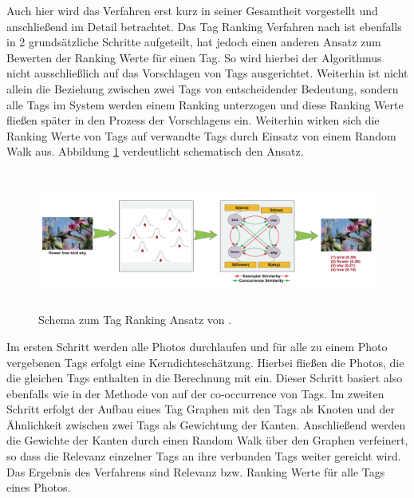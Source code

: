 
%     

Auch hier wird das Verfahren erst kurz in seiner Gesamtheit vorgestellt und anschließend im Detail betrachtet.
Das Tag Ranking Verfahren nach \cite{ranking} ist ebenfalls in 2 grundsätzliche Schritte aufgeteilt, hat jedoch einen anderen Ansatz zum Bewerten der Ranking Werte für einen Tag. So wird hierbei der Algorithmus nicht ausschließlich auf das Vorschlagen von Tags ausgerichtet. Weiterhin ist nicht allein die Beziehung zwischen zwei Tags von entscheidender Bedeutung, sondern alle Tags im System werden einem Ranking unterzogen und diese Ranking Werte fließen später in den Prozess der Vorschlagens ein. Weiterhin wirken sich die Ranking Werte von Tags auf verwandte Tags durch Einsatz von einem Random Walk aus. Abbildung \ref{fig:images_tag_ranking_verfahren} verdeutlicht schematisch den Ansatz.

\begin{figure}[htbp]
  \centering
    \includegraphics[height=1.8in]{images/tag_ranking_verfahren.png}
  \caption{Schema zum Tag Ranking Ansatz von \cite{ranking}.}
  \label{fig:images_tag_ranking_verfahren}
\end{figure}

Im ersten Schritt werden alle Photos durchlaufen und für alle zu einem Photo vergebenen Tags erfolgt eine Kerndichteschätzung. Hierbei fließen die Photos, die die gleichen Tags enthalten in die Berechnung mit ein. Dieser Schritt basiert also ebenfalls wie in der Methode von \cite{collectiveKnowledge} auf der co-occurrence von Tags. Im zweiten Schritt erfolgt der Aufbau eines Tag Graphen mit den Tags als Knoten und der Ähnlichkeit zwischen zwei Tags als Gewichtung der Kanten. Anschließend werden die Gewichte der Kanten durch einen Random Walk über den Graphen verfeinert, so dass die Relevanz einzelner Tags an ihre verbunden Tags weiter gereicht wird. Das Ergebnis des Verfahrens sind Relevanz bzw. Ranking Werte für alle Tags eines Photos.

